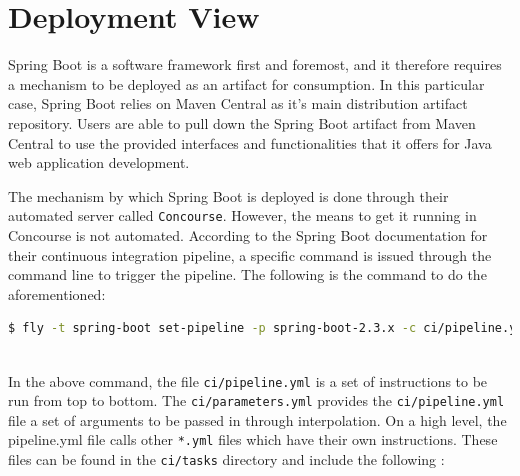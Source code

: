 \section{Deployment View}

Spring Boot is a software framework first and foremost, and it therefore requires a mechanism to be deployed as an artifact for consumption. In this particular case, Spring Boot relies on Maven Central as it's main distribution artifact repository. Users are able to pull down the Spring Boot artifact from Maven Central to use the provided interfaces and functionalities that it offers for Java web application development.

The mechanism by which Spring Boot is deployed is done through their automated server called \texttt{Concourse}. However, the means to get it running in Concourse is not automated. According to the Spring Boot documentation for their continuous integration pipeline, a specific command is issued through the command line to trigger the pipeline. The following is the command to do the aforementioned:\\

\begin{lstlisting}[language=bash, caption={Start Continuous Integration Pipeline Command \cite{springbootconcourse:online}}]
$ fly -t spring-boot set-pipeline -p spring-boot-2.3.x -c ci/pipeline.yml -l ci/parameters.yml
\end{lstlisting}\ \\

In the above command, the file \texttt{ci/pipeline.yml} is a set of instructions to be run from top to bottom. The \texttt{ci/parameters.yml} provides the \texttt{ci/pipeline.yml} file a set of arguments to be passed in through interpolation. On a high level, the pipeline.yml file calls other \texttt{*.yml} files which have their own instructions. These files can be found in the \texttt{ci/tasks} directory and include the following \cite{springboottasks:online}:

